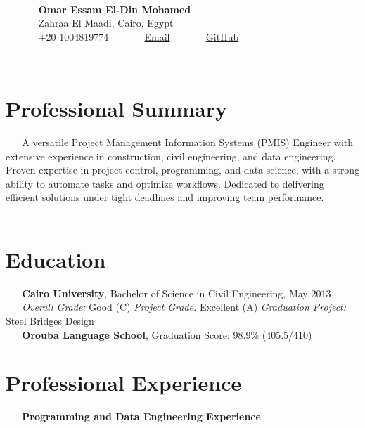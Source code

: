 \documentclass[10pt, letterpaper]{article}
\begin{document}
    \begin{center}
        {\LARGE \textbf{Omar Essam El-Din Mohamed}} \\
        {Zahraa El Maadi, Cairo, Egypt} \\
        {\faPhone* \hspace{0.2cm} +20 1004819774} \hspace{1cm}
        {\href{mailto:eng.omar.e@gmail.com}{\faEnvelope[regular] \hspace{0.2cm} Email}} \hspace{1cm}
        {\href{https://github.com/omare32}{\faGithub \hspace{0.2cm} GitHub}}
    \end{center}
    
    \section{Professional Summary}
    A versatile Project Management Information Systems (PMIS) Engineer with extensive experience in construction, civil engineering, and data engineering. Proven expertise in project control, programming, and data science, with a strong ability to automate tasks and optimize workflows. Dedicated to delivering efficient solutions under tight deadlines and improving team performance.
    
    \section{Education}
    \textbf{Cairo University}, Bachelor of Science in Civil Engineering, May 2013 \\
    \textit{Overall Grade:} Good (C) \hspace{1cm} \textit{Project Grade:} Excellent (A) \hspace{1cm} \textit{Graduation Project:} Steel Bridges Design \\
    \textbf{Orouba Language School}, Graduation Score: 98.9\% (405.5/410)
    
    \section{Professional Experience}
    \textbf{Programming and Data Engineering Experience}
\end{document}
